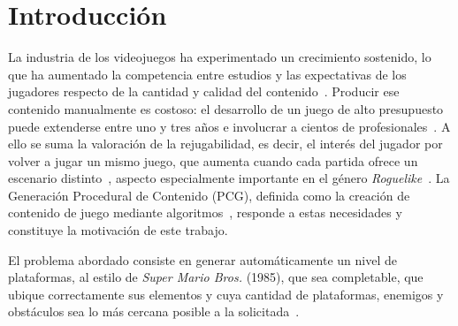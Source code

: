 \documentclass[letter, 10pt]{article}
\begin{document}
\begin{abstract}
El dise\~no manual de niveles de videojuegos es costoso, y la Generaci\'on Procedural de Contenido (PCG) lo automatiza mediante algoritmos. Este informe estudia la generaci\'on de niveles de plataformas 2D completables, coherentes con la f\'isica del personaje, con la cantidad solicitada de plataformas, enemigos y obst\'aculos y con la linealidad pedida. Se revisa la literatura del \'area, se formula un modelo de Programaci\'on con Restricciones y se implementa en C++ un algoritmo evolutivo sobre una representaci\'on por columnas, con un modelo de salto que discretiza la par\'abola del salto por columnas y operadores que act\'uan sobre tramos del nivel. En seis instancias de prueba, el algoritmo obtiene niveles completables con las cantidades exactas en las 180 ejecuciones, en promedio en 1,1~s, con alturas variadas entre semillas.
\end{abstract}

\section{Introducci\'on}
La industria de los videojuegos ha experimentado un crecimiento sostenido, lo que ha aumentado la competencia entre estudios y las expectativas de los jugadores respecto de la cantidad y calidad del contenido~\cite{DePontes2022, Saavedra2026}. Producir ese contenido manualmente es costoso: el desarrollo de un juego de alto presupuesto puede extenderse entre uno y tres a\~nos e involucrar a cientos de profesionales~\cite{DePontes2022}. A ello se suma la valoraci\'on de la rejugabilidad, es decir, el inter\'es del jugador por volver a jugar un mismo juego, que aumenta cuando cada partida ofrece un escenario distinto~\cite{DePontes2022, Smith2011}, aspecto especialmente importante en el g\'enero \emph{Roguelike}~\cite{Saavedra2026}. La Generaci\'on Procedural de Contenido (PCG), definida como la creaci\'on de contenido de juego mediante algoritmos~\cite{Togelius2011}, responde a estas necesidades y constituye la motivaci\'on de este trabajo.

El problema abordado consiste en generar autom\'aticamente un nivel de plataformas, al estilo de \emph{Super Mario Bros.} (1985), que sea completable, que ubique correctamente sus elementos y cuya cantidad de plataformas, enemigos y obst\'aculos sea lo m\'as cercana posible a la solicitada~\cite{Saavedra2026}.
\end{document}

